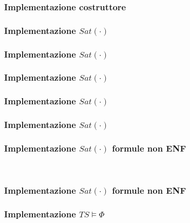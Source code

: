 \appendix

\begin{frame}[fragile]
  \frametitle{Implementazione costruttore}
\end{frame}

\begin{frame}[fragile]
  \frametitle{Implementazione $Sat(\cdot)$}
\end{frame}

\begin{frame}[fragile]
  \frametitle{Implementazione $Sat(\cdot)$}
\end{frame}

\begin{frame}[fragile]
  \frametitle{Implementazione $Sat(\cdot)$}
\end{frame}

\begin{frame}[fragile]
  \frametitle{Implementazione $Sat(\cdot)$}
\end{frame}

\begin{frame}[fragile]
  \frametitle{Implementazione $Sat(\cdot)$}
\end{frame}

\begin{frame}[fragile]
  \frametitle{Implementazione $Sat(\cdot)$ formule non \acs{ENF}}
  \rule{0mm}{0mm}\\[-5mm]
\end{frame}

\begin{frame}[fragile]
  \frametitle{Implementazione $Sat(\cdot)$ formule non \acs{ENF}}
\end{frame}

\begin{frame}[fragile]
  \frametitle{Implementazione $TS\models\Phi$}
\end{frame}

